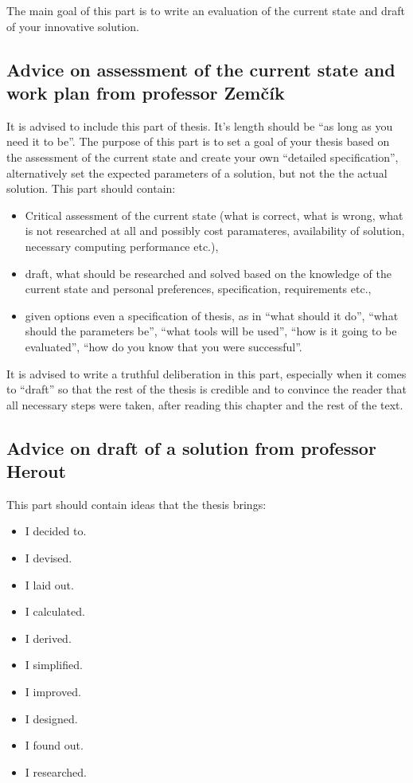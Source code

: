 {{The main goal of this part is to write an evaluation of the current state and draft of your innovative solution.

\subsection*{Advice on assessment of the current state and work plan from professor Zemčík}

It is advised to include this part of thesis. It's length should be ``as long as you need it to be''. The purpose of this part is to set a goal of your thesis based on the assessment of the current state and create your own ``detailed specification'', alternatively set the expected parameters of a solution, but not the the actual solution. This part should contain:
\begin{itemize}
  \item{Critical assessment of the current state (what is correct, what is wrong, what is not researched at all and possibly cost paramateres, availability of solution, necessary computing performance etc.),}
  \item{draft, what should be researched and solved based on the knowledge of the current state and personal preferences, specification, requirements etc.,}
  \item{given options even a specification of thesis, as in ``what should it do'', ``what should the parameters be'', ``what tools will be used'', ``how is it going to be evaluated'', ``how do you know that you were successful''.}
\end{itemize}
It is advised to write a truthful deliberation in this part, especially when it comes to ``draft'' so that the rest of the thesis is credible and to convince the reader that all necessary steps were taken, after reading this chapter and the rest of the text.


\subsection*{Advice on draft of a solution from professor Herout}

This part should contain ideas that the thesis brings:
\begin{itemize}
  \item{I decided to.}
  \item{I devised.}
  \item{I laid out.}
  \item{I calculated.}
  \item{I derived.}
  \item{I simplified.}
  \item{I improved.}
  \item{I designed.}
  \item{I found out.}
  \item{I researched.}
\end{itemize}

}}
